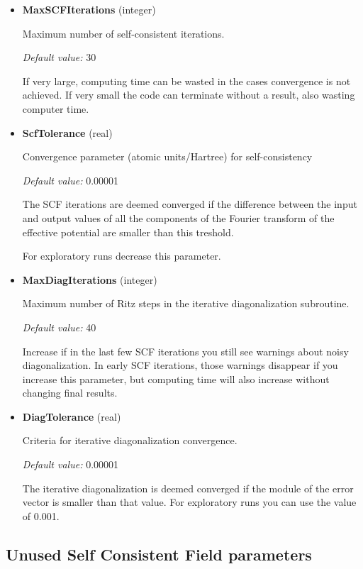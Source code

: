 \documentclass[11pt]{article}
\begin{document}
\begin{itemize}

\item{\bf MaxSCFIterations} (integer)

   Maximum number of self-consistent iterations.

  \textit{Default value:}  30

   If very large, computing time can be wasted
   in the cases convergence is not achieved.  If very small the code can terminate without a result, also wasting computer time.

\item{\bf ScfTolerance} (real)

   Convergence parameter (atomic units/Hartree) for self-consistency

  \textit{Default value:}  0.00001

   The SCF iterations are deemed converged if the difference between the input
   and output values of all the components of the Fourier transform of
   the effective potential are smaller than this treshold.

   For exploratory runs decrease this parameter.

\item{\bf MaxDiagIterations} (integer)

   Maximum number of Ritz steps in the iterative diagonalization subroutine.

  \textit{Default value:}  40

  Increase if in the last few SCF iterations you still see warnings about
  noisy diagonalization.  In early SCF iterations, those warnings disappear
  if you increase this parameter, but computing time will also increase
  without changing final results.

\item{\bf DiagTolerance} (real)

   Criteria for iterative diagonalization convergence.

   \textit{Default value:}  0.00001

   The iterative diagonalization is deemed converged if the module of the error vector is
   smaller than that value.
   For exploratory runs you can use the value of 0.001.


\end{itemize}


\subsection{Unused Self Consistent Field parameters}
\end{document}
